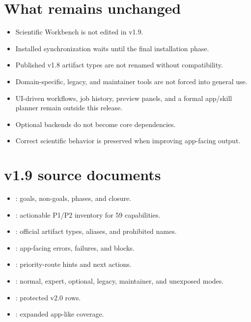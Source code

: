 \documentclass[11pt,a4paper]{article}
\begin{document}
\section{What remains unchanged}
\begin{itemize}[leftmargin=1.5em]
\item Scientific Workbench is not edited in v1.9.
\item Installed synchronization waits until the final installation phase.
\item Published v1.8 artifact types are not renamed without compatibility.
\item Domain-specific, legacy, and maintainer tools are not forced into general use.
\item UI-driven workflows, job history, preview panels, and a formal app/skill planner remain outside this release.
\item Optional backends do not become core dependencies.
\item Correct scientific behavior is preserved when improving app-facing output.
\end{itemize}

\section{v1.9 source documents}
\begin{itemize}[leftmargin=1.5em]
\item {}: goals, non-goals, phases, and closure.
\item {}: actionable P1/P2 inventory for 59 capabilities.
\item {}: official artifact types, aliases, and prohibited names.
\item {}: app-facing errors, failures, and blocks.
\item {}: priority-route hints and next actions.
\item {}: normal, expert, optional, legacy, maintainer, and unexposed modes.
\item {}: protected v2.0 rows.
\item {}: expanded app-like coverage.
\end{itemize}
\end{document}
